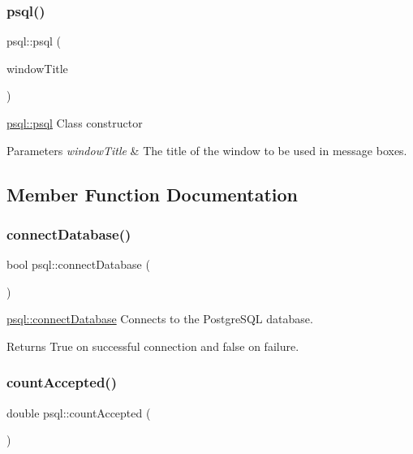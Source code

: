 \subsubsection{\texorpdfstring{psql()}{psql()}}
{\footnotesize\ttfamily psql\+::psql (\begin{DoxyParamCaption}\item[{Q\+String}]{window\+Title }\end{DoxyParamCaption})}



\mbox{\hyperlink{classpsql_aaff5fe0931dce097850982e44e6361af}{psql\+::psql}} Class constructor 


\begin{DoxyParams}{Parameters}
{\em window\+Title} & The title of the window to be used in message boxes. \\
\hline
\end{DoxyParams}


\subsection{Member Function Documentation}
\mbox{\label{classpsql_ada485c933df77453629e3821ab19fa4c}} 
\subsubsection{\texorpdfstring{connect\+Database()}{connectDatabase()}}
{\footnotesize\ttfamily bool psql\+::connect\+Database (\begin{DoxyParamCaption}{ }\end{DoxyParamCaption})}



\mbox{\hyperlink{classpsql_ada485c933df77453629e3821ab19fa4c}{psql\+::connect\+Database}} Connects to the Postgre\+S\+QL database. 

\begin{DoxyReturn}{Returns}
True on successful connection and false on failure. 
\end{DoxyReturn}
\mbox{\label{classpsql_a0beec2f098edc0961f27774cdd54d09b}} 
\subsubsection{\texorpdfstring{count\+Accepted()}{countAccepted()}}
{\footnotesize\ttfamily double psql\+::count\+Accepted (\begin{DoxyParamCaption}{ }\end{DoxyParamCaption})}



